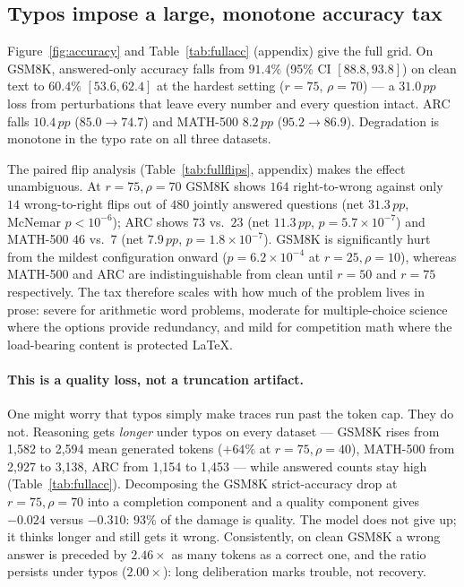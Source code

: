 \documentclass[11pt]{article}
\newcommand{\pp}{\,pp}
\begin{document}
\subsection{Typos impose a large, monotone accuracy tax}
\label{sec:accuracy}

Figure~\ref{fig:accuracy} and Table~\ref{tab:fullacc} (appendix) give the full
grid. On GSM8K, answered-only accuracy falls from $91.4\%$ (95\% CI
$[88.8, 93.8]$) on clean text to $60.4\%$ $[53.6, 62.4]$ at the hardest setting
($r{=}75$, $\rho{=}70$) --- a $31.0\pp$ loss from perturbations that leave every
number and every question intact. ARC falls $10.4\pp$ ($85.0\to74.7$) and
MATH-500 $8.2\pp$ ($95.2\to86.9$). Degradation is monotone in the typo rate on
all three datasets.

The paired flip analysis (Table~\ref{tab:fullflips}, appendix) makes the effect
unambiguous. At $r{=}75,\rho{=}70$ GSM8K shows $164$ right-to-wrong against only
$14$ wrong-to-right flips out of $480$ jointly answered questions (net
$31.3\pp$, McNemar $p<10^{-6}$); ARC shows $73$ vs.\ $23$ (net $11.3\pp$,
$p=5.7\times10^{-7}$) and MATH-500 $46$ vs.\ $7$ (net $7.9\pp$,
$p=1.8\times10^{-7}$). GSM8K is significantly hurt from the mildest
configuration onward ($p=6.2\times10^{-4}$ at $r{=}25,\rho{=}10$), whereas
MATH-500 and ARC are indistinguishable from clean until $r{=}50$ and $r{=}75$
respectively. The tax therefore scales with how much of the problem lives in
prose: severe for arithmetic word problems, moderate for multiple-choice science
where the options provide redundancy, and mild for competition math where the
load-bearing content is protected \LaTeX{}.

\paragraph{This is a quality loss, not a truncation artifact.}
One might worry that typos simply make traces run past the token cap. They do
not. Reasoning gets \emph{longer} under typos on every dataset --- GSM8K rises
from 1{,}582 to 2{,}594 mean generated tokens ($+64\%$ at $r{=}75,\rho{=}40$),
MATH-500 from 2{,}927 to 3{,}138, ARC from 1{,}154 to 1{,}453 --- while answered
counts stay high (Table~\ref{tab:fullacc}). Decomposing the GSM8K
strict-accuracy drop at $r{=}75,\rho{=}70$ into a completion component and a
quality component gives $-0.024$ versus $-0.310$: $93\%$ of the damage is
quality. The model does not give up; it thinks longer and still gets it wrong.
Consistently, on clean GSM8K a wrong answer is preceded by $2.46\times$ as many
tokens as a correct one, and the ratio persists under typos ($2.00\times$):
long deliberation marks trouble, not recovery.
\end{document}
